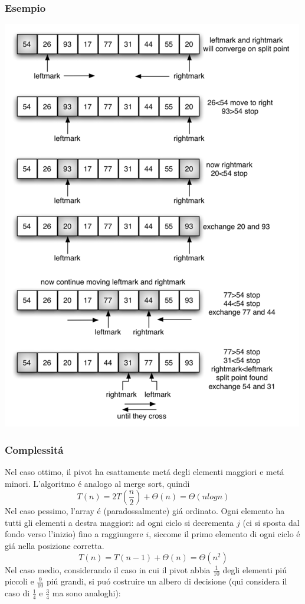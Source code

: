 \documentclass{article}
\begin{document}
\subsubsection{Esempio}
\includegraphics{quick-sort-example.png}

\subsubsection{Complessitá}
Nel caso ottimo, il pivot ha esattamente metá degli elementi maggiori e metá minori. L'algoritmo é analogo al merge sort, quindi $$T(n) = 2T(\frac{n}{2}) + \Theta(n) = \Theta(nlogn)$$
Nel caso pessimo, l'array é (paradossalmente) giá ordinato. Ogni elemento ha tutti gli elementi a destra maggiori: ad ogni ciclo si decrementa $j$ (ci si sposta dal fondo verso l'inizio) fino a raggiungere $i$, siccome il primo elemento di ogni ciclo é giá nella posizione corretta. $$T(n) = T(n-1) + \Theta(n) = \Theta(n^2)$$
Nel caso medio, considerando il caso in cui il pivot abbia $\frac{1}{10}$ degli elementi piú piccoli e $\frac{9}{10}$ piú grandi, si puó costruire un albero di decisione (qui considera il caso di $\frac{1}{4}$ e $\frac{3}{4}$ ma sono analoghi):
\end{document}
